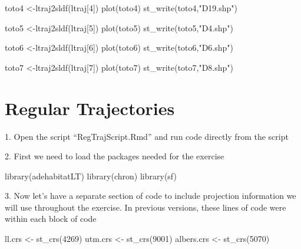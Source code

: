 \documentclass[
  letterpaper,
]{book}
\newenvironment{Shaded}{\begin{snugshade}}{\end{snugshade}}
\newcommand{\DecValTok}[1]{\textcolor[rgb]{0.68,0.00,0.00}{#1}}
\newcommand{\FunctionTok}[1]{\textcolor[rgb]{0.28,0.35,0.67}{#1}}
\newcommand{\NormalTok}[1]{\textcolor[rgb]{0.00,0.23,0.31}{#1}}
\newcommand{\OtherTok}[1]{\textcolor[rgb]{0.00,0.23,0.31}{#1}}
\newcommand{\StringTok}[1]{\textcolor[rgb]{0.13,0.47,0.30}{#1}}
\begin{document}
\begin{Shaded}
\begin{Highlighting}[]
\NormalTok{toto4 }\OtherTok{\textless{}{-}}\FunctionTok{ltraj2sldf}\NormalTok{(ltraj[}\DecValTok{4}\NormalTok{])}
\FunctionTok{plot}\NormalTok{(toto4)}
\FunctionTok{st\_write}\NormalTok{(toto4,}\StringTok{"D19.shp"}\NormalTok{)}

\NormalTok{toto5 }\OtherTok{\textless{}{-}}\FunctionTok{ltraj2sldf}\NormalTok{(ltraj[}\DecValTok{5}\NormalTok{])}
\FunctionTok{plot}\NormalTok{(toto5)}
\FunctionTok{st\_write}\NormalTok{(toto5,}\StringTok{"D4.shp"}\NormalTok{)}

\NormalTok{toto6 }\OtherTok{\textless{}{-}}\FunctionTok{ltraj2sldf}\NormalTok{(ltraj[}\DecValTok{6}\NormalTok{])}
\FunctionTok{plot}\NormalTok{(toto6)}
\FunctionTok{st\_write}\NormalTok{(toto6,}\StringTok{"D6.shp"}\NormalTok{)}

\NormalTok{toto7 }\OtherTok{\textless{}{-}}\FunctionTok{ltraj2sldf}\NormalTok{(ltraj[}\DecValTok{7}\NormalTok{])}
\FunctionTok{plot}\NormalTok{(toto7)}
\FunctionTok{st\_write}\NormalTok{(toto7,}\StringTok{"D8.shp"}\NormalTok{)}
\end{Highlighting}
\end{Shaded}

\hypertarget{regular-trajectories}{%
\chapter{Regular Trajectories}\label{regular-trajectories}}

1. Open the script ``RegTrajScript.Rmd'' and run code directly from the
script

2. First we need to load the packages needed for the exercise

\begin{Shaded}
\begin{Highlighting}[]
\FunctionTok{library}\NormalTok{(adehabitatLT)}
\FunctionTok{library}\NormalTok{(chron)}
\FunctionTok{library}\NormalTok{(sf)}
\end{Highlighting}
\end{Shaded}

3. Now let's have a separate section of code to include projection
information we will use throughout the exercise. In previous versions,
these lines of code were within each block of code

\begin{Shaded}
\begin{Highlighting}[]
\NormalTok{ll.crs }\OtherTok{\textless{}{-}} \FunctionTok{st\_crs}\NormalTok{(}\DecValTok{4269}\NormalTok{)}
\NormalTok{utm.crs }\OtherTok{\textless{}{-}} \FunctionTok{st\_crs}\NormalTok{(}\DecValTok{9001}\NormalTok{)}
\NormalTok{albers.crs }\OtherTok{\textless{}{-}} \FunctionTok{st\_crs}\NormalTok{(}\DecValTok{5070}\NormalTok{)}
\end{Highlighting}
\end{Shaded}
\end{document}
